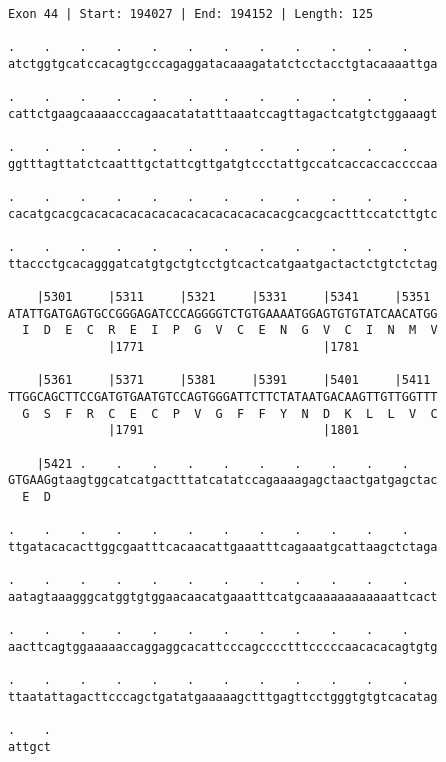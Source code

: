 \documentclass{article}
\begin{document}
\begin{Verbatim}
Exon 44 | Start: 194027 | End: 194152 | Length: 125
 
.    .    .    .    .    .    .    .    .    .    .    .    
atctggtgcatccacagtgcccagaggatacaaagatatctcctacctgtacaaaattga
  
.    .    .    .    .    .    .    .    .    .    .    .    
cattctgaagcaaaacccagaacatatatttaaatccagttagactcatgtctggaaagt
  
.    .    .    .    .    .    .    .    .    .    .    .    
ggtttagttatctcaatttgctattcgttgatgtccctattgccatcaccaccaccccaa
  
.    .    .    .    .    .    .    .    .    .    .    .    
cacatgcacgcacacacacacacacacacacacacacacgcacgcactttccatcttgtc
  
.    .    .    .    .    .    .    .    .    .    .    .    
ttaccctgcacagggatcatgtgctgtcctgtcactcatgaatgactactctgtctctag
  
    |5301     |5311     |5321     |5331     |5341     |5351 
ATATTGATGAGTGCCGGGAGATCCCAGGGGTCTGTGAAAATGGAGTGTGTATCAACATGG
  I  D  E  C  R  E  I  P  G  V  C  E  N  G  V  C  I  N  M  V
              |1771                         |1781           
  
    |5361     |5371     |5381     |5391     |5401     |5411 
TTGGCAGCTTCCGATGTGAATGTCCAGTGGGATTCTTCTATAATGACAAGTTGTTGGTTT
  G  S  F  R  C  E  C  P  V  G  F  F  Y  N  D  K  L  L  V  C
              |1791                         |1801           
  
    |5421 .    .    .    .    .    .    .    .    .    .    
GTGAAGgtaagtggcatcatgactttatcatatccagaaaagagctaactgatgagctac
  E  D                                                      
  
.    .    .    .    .    .    .    .    .    .    .    .    
ttgatacacacttggcgaatttcacaacattgaaatttcagaaatgcattaagctctaga
  
.    .    .    .    .    .    .    .    .    .    .    .    
aatagtaaagggcatggtgtggaacaacatgaaatttcatgcaaaaaaaaaaaattcact
  
.    .    .    .    .    .    .    .    .    .    .    .    
aacttcagtggaaaaaccaggaggcacattcccagcccctttcccccaacacacagtgtg
  
.    .    .    .    .    .    .    .    .    .    .    .    
ttaatattagacttcccagctgatatgaaaaagctttgagttcctgggtgtgtcacatag
  
.    .
attgct
\end{Verbatim}
\newpage
\end{document}
